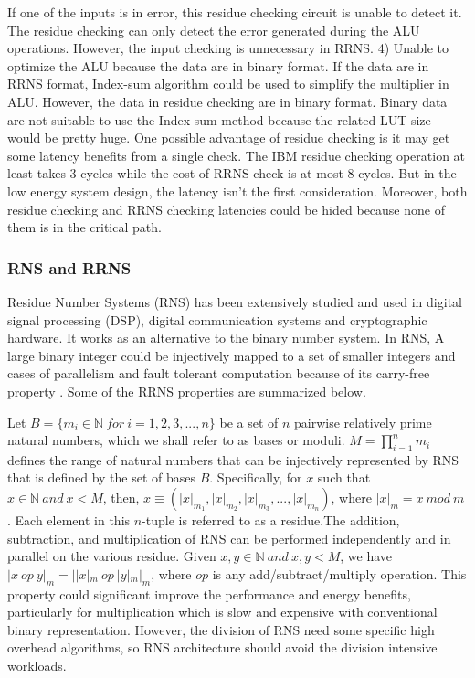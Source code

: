 \documentclass{sig-alternate}
\begin{document}
If one of the inputs is in error, this residue checking circuit is unable to detect it. The residue checking can only detect the error generated during the ALU operations. However, the input checking is unnecessary in RRNS. 
4) Unable to optimize the ALU because the data are in binary format. If the data are in RRNS format, Index-sum algorithm\cite{DengTACO18} could be used to simplify the multiplier in ALU. However, the data in residue checking are in binary format. Binary data are not suitable to use the Index-sum method because the related LUT size would be pretty huge. \newline
One possible advantage of residue checking is it may get some latency benefits from a single check. The IBM residue checking operation at least takes 3 cycles while the cost of RRNS check is at most 8 cycles. But in the low energy system design, the latency isn't the first consideration. Moreover, both residue checking and RRNS checking latencies could be hided because none of them is in the critical path. 


\subsubsection{RNS and RRNS}
\label{sub:RRNS}
Residue Number Systems (RNS) has been extensively studied and used in digital signal processing (DSP), digital communication systems and cryptographic hardware. It works as an alternative to the binary number system. In RNS,  A large binary integer could be injectively mapped to a set of smaller integers and cases of parallelism and fault tolerant computation because of its carry-free property \cite{EricDSR,AndersonThesis}. Some of the RRNS properties are summarized below.

Let $B=\{m_i\in \mathbb{N}~for~i = 1,2,3,...,n\}$ be a set of $n$ pairwise relatively prime natural numbers, which we shall refer to as bases or moduli. $M=\prod_{i=1}^{n}m_i$ defines the range of natural numbers that can be injectively represented by RNS that is defined by the set of bases $B$. Specifically, for $x$ such that $x\in\mathbb{N}~and ~x < M$, then, $x \equiv (|x|_{m_1}, |x|_{m_2}, |x|_{m_3}, ..., |x|_{m_n})$, where $|x|_m = x~mod~m$. Each element in this $n$-tuple is referred to as a residue.The addition, subtraction, and multiplication of RNS can be performed independently and in parallel on the various residue. Given $x, y \in \mathbb{N}~and ~x, y < M$, we have $|x~op~y|_m=||x|_m~op~|y|_m|_m$, where $op$ is any add/subtract/multiply operation. This property could significant improve the performance and energy benefits, particularly for multiplication which is slow and expensive with conventional binary representation. However, the division of RNS need some specific high overhead algorithms\cite{RNSDivisionMansoureh,RNSDivisionTalahmeh}, so RNS architecture should avoid the division intensive workloads.
\end{document}
